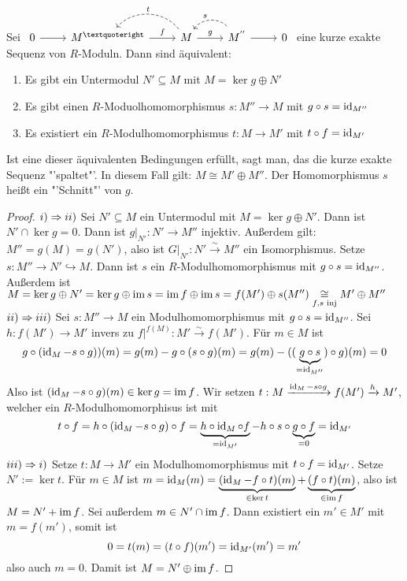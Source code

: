 \begin{sa}\label{sa2.2}
	Sei $\begin{tikzcd}
	0  \arrow{r} & M^{’} \arrow{r}{f} & M \arrow{r}{g}\arrow[bend right = 50,swap, dashed]{l}{t} & M^{''}\arrow[bend right = 50,swap, dashed]{l}{s} \arrow{r} & 0
	\end{tikzcd}$ eine kurze exakte Sequenz von $R$-Moduln. Dann sind äquivalent:
	\begin{enumerate}[label= \roman*)]
		\item Es gibt ein Untermodul $N'\subseteq M$ mit $M= \ker g \oplus N'$
		\item Es gibt einen $R$-Moduolhomomorphismus $s:M''\to M$ mit $g \circ s = \operatorname{id}_{M''}$
		\item Es existiert ein $R$-Modulhomomorphismus $t:M \to M'$ mit $t\circ f = \operatorname{id}_{M'}$
	\end{enumerate}
	Ist eine dieser äquivalenten Bedingungen erfüllt, sagt man, das die kurze exakte Sequenz "'spaltet"'. In diesem Fall gilt: $M \cong M' \oplus M''$. Der Homomorphismus $s$ heißt ein "'Schnitt"' von $g$.
\end{sa}
\begin{proof}
	$i) \Rightarrow ii)$ Sei $N'\subseteq M$ ein Untermodul mit $M= \ker g \oplus N'$. Dann ist $N'\cap \ker g = 0$. Dann ist $g\big|_{N'} : N' \to M''$ injektiv. Außerdem gilt: $M''= g(M) = g(N')$, also ist $G\big|_{N'} : N' \overset{\sim}{\longrightarrow} M''$ ein Isomorphismus. Setze $s:M'' \to N' \hookrightarrow M$. Dann ist $s$ ein $R$-Modulhomomorphismus mit $g\circ s = \operatorname{id}_{M''}$. Außerdem ist $M= \ker g \oplus N' = \ker g \oplus \operatorname{im} s = \operatorname{im} f \oplus \operatorname{im} s = f(M') \oplus s(M'') \underset{f,s\text{ inj}}{\cong} M' \oplus M''$\\
	$ii) \Rightarrow iii)$ Sei $s:M'' \to M$ ein Modulhomomorphismus mit $g\circ s= \operatorname{id}_{M''}$. Sei $h:f(M') \to M'$ invers zu $f\big|^{f(M)}: M' \overset{\sim}{\longrightarrow} f(M')$. Für $m\in M$ ist 
	$$g\circ (\operatorname{id}_M - s\circ g))(m) = g(m) - g\circ (s\circ g)(m) = g(m) - ((\underbrace{g\circ s}_{=\operatorname{id}_{M''}}) \circ g)(m) = 0$$
	Also ist $(\operatorname{id}_{M} - s\circ g)(m) \in \ker g = \operatorname{im} f$. Wir setzen $t:M \xrightarrow{\operatorname{id}_M - s\circ g} f(M') \xrightarrow{h} M'$, welcher ein $R$-Modulhomomorphisus ist mit 
	$$t\circ f = h\circ (\operatorname{id}_M - s\circ g)\circ f = \underbrace{h\circ \operatorname{id}_M \circ f}_{=\operatorname{id}_{M'}} - h\circ s \circ \underbrace{g\circ f}_{=0} = \operatorname{id}_{M'}$$
	$iii)\Rightarrow i)$ Setze $t:M\to M'$ ein Modulhomomorphismus mit $t\circ f = \operatorname{id}_{M'}$. Setze $N':= \ker t$. Für $m\in M$ ist $m=\operatorname{id}_M(m) = \underbrace{(\operatorname{id}_M- f\circ t)(m)}_{\in \ker t} + \underbrace{(f\circ t)(m)}_{\in \operatorname{im} f}$, also ist $M= N' + \operatorname{im} f$. Sei außerdem $m\in N' \cap \operatorname{im} f$. Dann existiert ein $m'\in M'$ mit $m= f(m')$, somit ist
	$$0 =t(m) = (t\circ f)(m') = \operatorname{id}_{M'}(m') = m'$$
	also auch $m=0$. Damit ist $M= N' \oplus \operatorname{im} f$.
\end{proof}
